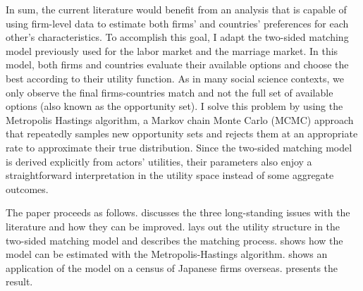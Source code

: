 In sum, the current literature would benefit from an analysis that is capable of using firm-level data to estimate both firms' and countries' preferences for each other's characteristics. To accomplish this goal, I adapt the two-sided matching model previously used for the labor market and the marriage market. In this model, both firms and countries evaluate their available options and choose the best according to their utility function. As in many social science contexts, we only observe the final firms-countries match and not the full set of available options (also known as the opportunity set). I solve this problem by using the Metropolis Hastings algorithm, a Markov chain Monte Carlo (MCMC) approach that repeatedly samples new opportunity sets and rejects them at an appropriate rate to approximate their true distribution. Since the two-sided matching model is derived explicitly from actors' utilities, their parameters also enjoy a straightforward interpretation in the utility space instead of some aggregate outcomes.

The paper proceeds as follows.  discusses the three long-standing issues with the literature and how they can be improved.  lays out the utility structure in the two-sided matching model and describes the matching process.  shows how the model can be estimated with the Metropolis-Hastings algorithm.  shows an application of the model on a census of Japanese firms overseas.  presents the result.